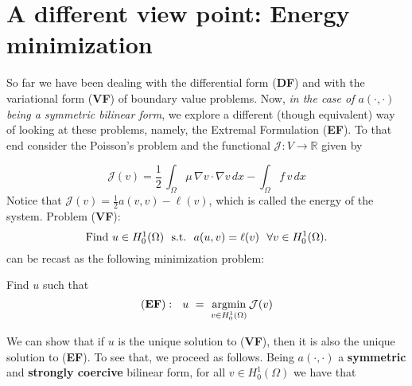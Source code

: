 \section{A different view point: Energy minimization} 

So far we have been dealing with the differential form (\textbf{DF})
and with the variational form (\textbf{VF}) of boundary value problems.
Now, \emph{in the case of $a(\cdot,\cdot)$ being a symmetric bilinear form},
we explore a different (though equivalent) way of looking at these
problems, namely, the Extremal Formulation (\textbf{EF}).
To that end consider the Poisson's problem and the
functional $\mathcal{J}: V \rightarrow \mathbb{R}$ given by

\begin{equation}
\mathcal{J}(v) = \frac12 \, \int_{\Omega}{\mu\,\nabla{v}\cdot \nabla{v}}\,dx - \int_{\Omega}{f\,v}\,dx
\end{equation}
Notice that $\mathcal{J}(v) = \frac12 a(v,v) - \ell(v)$, which is called
the energy of the system.  Problem (\textbf{VF}):
\begin{equation}
\mbox{Find $u \in H^1_0(\Omega)$~~s.t.~~} a(u,v) =
        \ell(v)~~\forall v \in H^1_0(\Omega). \labeq{poissonvarformagain}
\end{equation}
can be recast as the following minimization problem:
\begin{kaobox}[frametitle=Extremal form of Poisson's problem] 
Find $u$ such that
\begin{equation}
(\mbox{\textbf{EF}}):~~
 u ~=~ \operatorname*{argmin}\limits_{v \in H^1_0(\Omega)}{\mathcal{J}(v)}
\end{equation}
\end{kaobox}
We can show that if $u$ is the unique solution to (\textbf{VF}), then it is also the
unique solution to (\textbf{EF}). To see that, we proceed as follows.
Being $a(\cdot,\cdot)$ a \textbf{symmetric} and
\textbf{strongly coercive} bilinear form, for all $v\in H^1_0(\Omega)$
we have that
